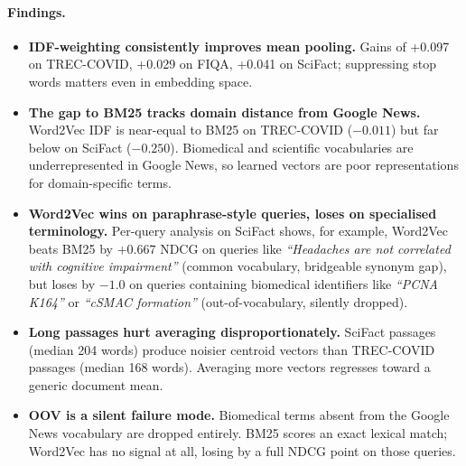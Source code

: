 \documentclass[12pt, a4paper]{article}
\newcommand{\tc}{TREC-COVID}
\newcommand{\fiqa}{FIQA}
\newcommand{\scifact}{SciFact}
\begin{document}
\paragraph{Findings.}
\begin{itemize}
  \item \textbf{IDF-weighting consistently improves mean pooling.}
        Gains of +0.097 on \tc{}, +0.029 on \fiqa{}, +0.041 on \scifact{};
        suppressing stop words matters even in embedding space.
  \item \textbf{The gap to BM25 tracks domain distance from Google News.}
        Word2Vec IDF is near-equal to BM25 on \tc{} ($-0.011$) but far below on
        \scifact{} ($-0.250$).  Biomedical and scientific vocabularies are
        underrepresented in Google News, so learned vectors are poor
        representations for domain-specific terms.
  \item \textbf{Word2Vec wins on paraphrase-style queries, loses on specialised
        terminology.}  Per-query analysis on \scifact{} shows, for example,
        Word2Vec beats BM25 by $+0.667$ NDCG on queries like
        \textit{``Headaches are not correlated with cognitive impairment''}
        (common vocabulary, bridgeable synonym gap), but loses by $-1.0$ on
        queries containing biomedical identifiers like
        \textit{``PCNA K164''} or \textit{``cSMAC formation''} (out-of-vocabulary,
        silently dropped).
  \item \textbf{Long passages hurt averaging disproportionately.}
        \scifact{} passages (median 204 words) produce noisier centroid vectors
        than \tc{} passages (median 168 words).  Averaging more vectors
        regresses toward a generic document mean.
  \item \textbf{OOV is a silent failure mode.}
        Biomedical terms absent from the Google News vocabulary are dropped
        entirely.  BM25 scores an exact lexical match; Word2Vec has no signal
        at all, losing by a full NDCG point on those queries.
\end{itemize}
\end{document}
